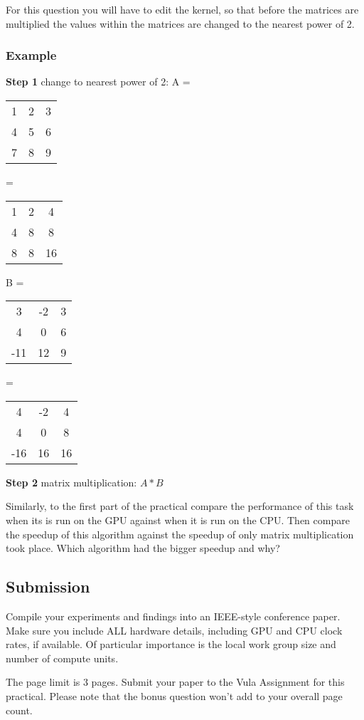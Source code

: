 For this question you will have to edit the kernel, so that before the matrices are multiplied the values within the matrices are changed to the nearest power of 2.

\subsubsection{Example}
\textbf{Step 1} change to nearest power of 2: \newline
A = 
\begin{tabular}{ c c c }
1 & 2 & 3\\
4 & 5 & 6\\
7 & 8 & 9
\end{tabular}
=
\begin{tabular}{ c c c }
1 & 2 & 4\\
4 & 8 & 8\\
8 & 8 & 16
\end{tabular}

B = 
\begin{tabular}{ c c c }
3 & -2 & 3\\
4 & 0 & 6\\
-11 & 12 & 9
\end{tabular}
=
\begin{tabular}{ c c c }
4 & -2 & 4\\
4 & 0 & 8\\
-16 & 16 & 16
\end{tabular}

\textbf{Step 2} matrix multiplication: \newline
$A*B$

Similarly, to the first part of the practical compare the performance of this task when its is run on the GPU against when it is run on the CPU. Then compare the speedup of this algorithm against the speedup of only matrix multiplication took place. Which algorithm had the bigger speedup and why?

\subsection{Submission}
Compile your experiments and findings into an IEEE-style conference paper. Make sure you include ALL hardware details, including GPU and CPU clock rates, if available. Of particular importance is the local work group size and number of compute units.

The page limit is 3 pages. Submit your paper to the Vula Assignment for this practical. Please note that the bonus question won't add to your overall page count.

